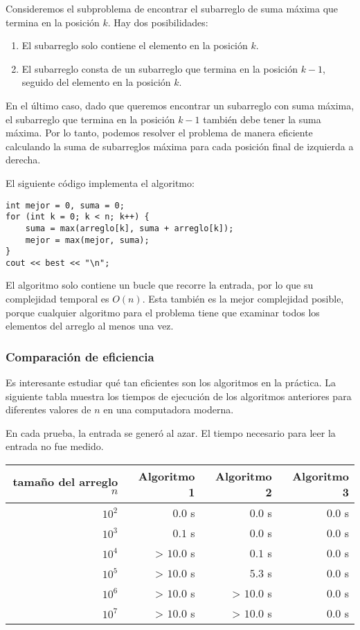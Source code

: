 Consideremos el subproblema de encontrar el subarreglo de suma máxima
que termina en la posición $k$.
Hay dos posibilidades:
\begin{enumerate}
    \item El subarreglo solo contiene el elemento en la posición $k$.
    \item El subarreglo consta de un subarreglo que termina
          en la posición $k-1$, seguido del elemento en la posición $k$.
\end{enumerate}

En el último caso, dado que queremos
encontrar un subarreglo con suma máxima,
el subarreglo que termina en la posición $k-1$
también debe tener la suma máxima.
Por lo tanto, podemos resolver el problema de manera eficiente
calculando la suma de subarreglos máxima
para cada posición final de izquierda a derecha.

El siguiente código implementa el algoritmo:
\begin{lstlisting}
int mejor = 0, suma = 0;
for (int k = 0; k < n; k++) {
    suma = max(arreglo[k], suma + arreglo[k]);
    mejor = max(mejor, suma);
}
cout << best << "\n";
\end{lstlisting}

El algoritmo solo contiene un bucle
que recorre la entrada,
por lo que su complejidad temporal es $O(n)$.
Esta también es la mejor complejidad posible,
porque cualquier algoritmo para el problema
tiene que examinar todos los elementos del arreglo al menos una vez.

\subsubsection{Comparación de eficiencia}

Es interesante estudiar qué tan eficientes
son los algoritmos en la práctica.
La siguiente tabla muestra los tiempos de ejecución
de los algoritmos anteriores para diferentes
valores de $n$ en una computadora moderna.

En cada prueba, la entrada se generó al azar.
El tiempo necesario para leer la entrada no fue
medido.

\begin{center}
    \begin{tabular}{rrrr}
        tamaño del arreglo $n$ & Algoritmo 1 & Algoritmo 2 & Algoritmo 3 \\
        \hline
        $10^2$                 & $0.0$ s     & $0.0$ s     & $0.0$ s     \\
        $10^3$                 & $0.1$ s     & $0.0$ s     & $0.0$ s     \\
        $10^4$                 & > $10.0$ s  & $0.1$ s     & $0.0$ s     \\
        $10^5$                 & > $10.0$ s  & $5.3$ s     & $0.0$ s     \\
        $10^6$                 & > $10.0$ s  & > $10.0$ s  & $0.0$ s     \\
        $10^7$                 & > $10.0$ s  & > $10.0$ s  & $0.0$ s     \\
    \end{tabular}
\end{center}

